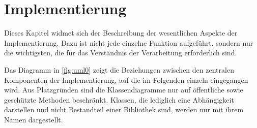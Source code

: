\chapter{Implementierung}
Dieses Kapitel widmet sich der Beschreibung der wesentlichen Aspekte der Implementierung.
Dazu ist nicht jede einzelne Funktion aufgeführt, sondern nur die wichtigsten, die für das Verständnis der Verarbeitung erforderlich sind.

Das Diagramm in \autoref{fig:uml0} zeigt die Beziehungen zwischen den zentralen Komponenten der Implementierung, auf die im Folgenden einzeln eingegangen wird.
Aus Platzgründen sind die Klassendiagramme nur auf öffentliche sowie geschützte Methoden beschränkt.
Klassen, die lediglich eine Abhängigkeit darstellen und nicht Bestandteil einer Bibliothek sind, werden nur mit ihrem Namen dargestellt.












